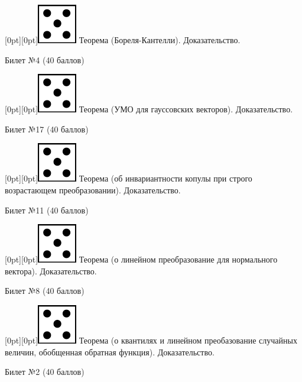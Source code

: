 \documentclass[10pt]{article}
\begin{document}
\raisebox{-1pt}[0pt][0pt]{\includegraphics[width=0.02\linewidth]{5.png}} Теорема (Бореля-Кантелли). Доказательство. \\

\begin{center} {\Large Билет №4 (40 баллов)} \end{center}

\raisebox{-1pt}[0pt][0pt]{\includegraphics[width=0.02\linewidth]{5.png}} Теорема (УМО для гауссовских векторов). Доказательство. \\

\begin{center} {\Large Билет №17 (40 баллов)} \end{center}

\raisebox{-1pt}[0pt][0pt]{\includegraphics[width=0.02\linewidth]{5.png}} Теорема (об инвариантности копулы при строго возрастающем преобразовании). Доказательство. \\

\begin{center} {\Large Билет №11 (40 баллов)} \end{center}

\raisebox{-1pt}[0pt][0pt]{\includegraphics[width=0.02\linewidth]{5.png}} Теорема (о линейном преобразование для нормального вектора). Доказательство. \\

\begin{center} {\Large Билет №8 (40 баллов)} \end{center}

\raisebox{-1pt}[0pt][0pt]{\includegraphics[width=0.02\linewidth]{5.png}}   Теорема (о квантилях и линейном преобазование случайных величин, обобщенная обратная функция). Доказательство. \\

\begin{center} {\Large Билет №2 (40 баллов)} \end{center}
\end{document}
